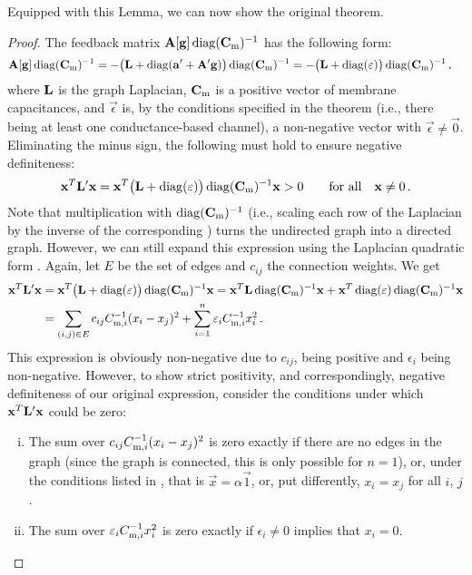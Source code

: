 Equipped with this Lemma, we can now show the original theorem.

\ThmNlifConvergence*

\begin{proof}
The feedback matrix $\mathbf{A}[\mathbf{g}] \operatorname{\mathrm{diag}}({{\mathbf{C}}_\mathrm{m}})^{-1}$ has the following form:
\begin{align*}
	\mathbf{A}[\mathbf{g}] \operatorname{\mathrm{diag}}({{\mathbf{C}}_\mathrm{m}})^{-1}
	&= -\bigl( \mathbf{L} + \operatorname{\mathrm{diag}}(\mathbf{a}' + \mathbf{A}' \mathbf{g}) \bigr) \operatorname{\mathrm{diag}}({{\mathbf{C}}_\mathrm{m}})^{-1} 
	 = -\bigl( \mathbf{L} + \operatorname{\mathrm{diag}}(\mathbf{\varepsilon}) \bigr) \operatorname{\mathrm{diag}}({{\mathbf{C}}_\mathrm{m}})^{-1}  \,,
\end{align*}
where $\mathbf{L}$ is the graph Laplacian, ${{\mathbf{C}}_\mathrm{m}}$ is a positive vector of membrane capacitances, and $\vec \epsilon$ is, by the conditions specified in the theorem (i.e., there being at least one conductance-based channel), a non-negative vector with $\vec \epsilon \neq \vec 0$.
Eliminating the minus sign, the following must hold to ensure negative definiteness:
\begin{align*}
	 \mathbf{x}^T \mathbf{L}' \mathbf{x} 
	 	= \mathbf{x}^T \bigl( \mathbf{L} + \operatorname{\mathrm{diag}}(\mathbf{\varepsilon}) \bigr) \operatorname{\mathrm{diag}}(\mathbf{{{\mathbf{C}}_\mathrm{m}}})^{-1} \mathbf{x}
	 	> 0 \quad\quad \text{for all} \quad \mathbf{x} \neq 0 \,.
\end{align*}
Note that multiplication with $\operatorname{\mathrm{diag}}({{\mathbf{C}}_\mathrm{m}})^{-1}$ (i.e., scaling each row of the Laplacian by the inverse of the corresponding \Cm) turns the undirected graph into a directed graph.
However, we can still expand this expression using the Laplacian quadratic form \citep[cf.][Section~18.3.5]{spielman2012spectral}.
Again, let $E$ be the set of edges and $c_{ij}$ the connection weights.
We get
\begin{align*}
	\mathbf{x}^T \mathbf{L}' \mathbf{x}
	&= \mathbf{x}^T \bigl( \mathbf{L} + \operatorname{\mathrm{diag}}(\mathbf{\varepsilon}) \bigr) \operatorname{\mathrm{diag}}({{\mathbf{C}}_\mathrm{m}})^{-1} \mathbf{x}
	 = \mathbf{x}^T \mathbf{L} \operatorname{\mathrm{diag}}({{\mathbf{C}}_\mathrm{m}})^{-1} \mathbf{x}
	 + \mathbf{x}^T \operatorname{\mathrm{diag}}(\mathbf{\varepsilon}) \operatorname{\mathrm{diag}}({{\mathbf{C}}_\mathrm{m}})^{-1} \mathbf{x} \\
	&= \sum_{(i, j) \in E} c_{ij} {C_{\mathrm{m}, i}^{-1}} (x_i - x_j)^2 + \sum_{i = 1}^n \varepsilon_i {C_{\mathrm{m}, i}^{-1}} x_i^2 \,.
\end{align*}
This expression is obviously non-negative due to $c_{ij}$, \CmiInv being positive and $\epsilon_i$ being non-negative.
However, to show strict positivity, and correspondingly, negative definiteness of our original expression, consider the conditions under which $\mathbf{x}^T \mathbf{L}' \mathbf{x}$ could be zero:
\begin{enumerate}[(i)]
	\item The sum over $c_{ij} {C_{\mathrm{m}, i}^{-1}} (x_i - x_j)^2$ is zero exactly if there are no edges in the graph (since the graph is connected, this is only possible for $n = 1$), or, under the conditions listed in , that is $\vec x = \alpha \vec{1}$, or, put differently, $x_i = x_j$ for all $i$, $j$.
	\item The sum over $\varepsilon_i {C_{\mathrm{m}, i}^{-1}} x_i^2$ is zero exactly if $\epsilon_i \neq 0$ implies that $x_i = 0$.
\end{enumerate}


\end{proof}

